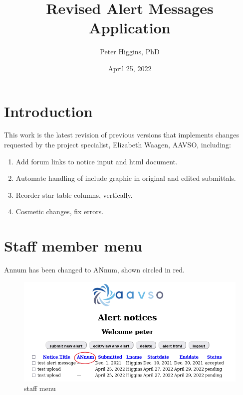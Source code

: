 \documentclass[11pt]{article}
\title{Revised Alert Messages Application}
\author{Peter Higgins, PhD}
\date{April 25, 2022}
\begin{document}
\maketitle




\section{Introduction}

This work is the latest revision of previous versions that implements changes requested by the project specialist, Elizabeth Waagen, AAVSO, including:

\begin{enumerate}
	\item Add forum links to notice input and html document.     
    \item Automate handling of include graphic in original and edited submittals.    
    \item Reorder star table columns, vertically.    
    \item Cosmetic changes, fix errors.
    
\end{enumerate}   

\section{Staff member menu}
Annum has been changed to ANnum, shown circled in red.
\begin{figure}[hbtp]
\centering
\includegraphics[scale=1]{menu1.png}
\caption{staff menu}
\end{figure}
\end{document}

